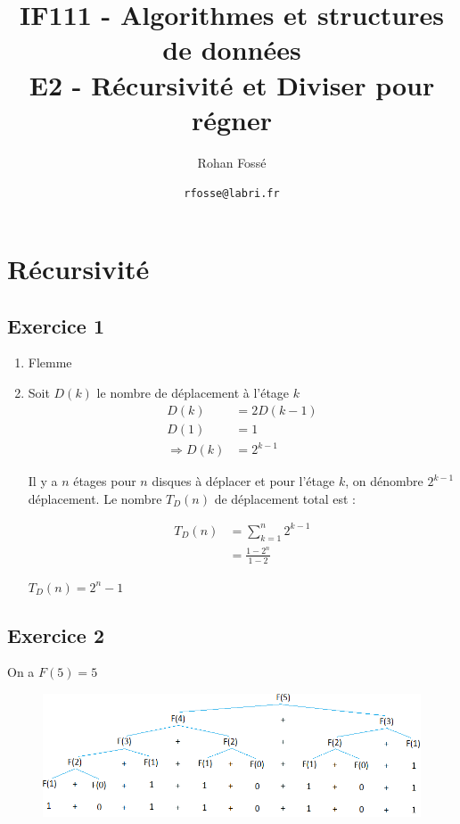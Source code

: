 \documentclass{article}[12pt]
\title{IF111 - Algorithmes et structures de données\\E2 - Récursivité et Diviser pour régner}
\date{\texttt{rfosse@labri.fr}}
\author{Rohan Fossé}
\begin{document}
\maketitle{}

\section{Récursivité}

\subsection*{Exercice 1}
\begin{enumerate}
\item Flemme



        \item Soit $D(k)$ le nombre de déplacement à l'étage $k$
        \begin{align*}
            D(k) &= 2D(k-1)\\
            D(1) &= 1\\
            \Rightarrow D(k) &= 2^{k-1}
        \end{align*}
        
        Il y a $n$ étages pour $n$ disques à déplacer et pour l'étage $k
        $, on dénombre $2^{k-1}$ déplacement. Le nombre $T_D(n)$ de déplacement total est :
        
        \begin{align*}
            T_D(n) &= \sum_{k=1}^{n}2^{k-1}\\
            & = \frac{1-2^n}{1-2}
        \end{align*}
        \begin{center}
            \begin{tcolorbox}[text width = 2.8cm]
                $T_D(n) = 2^n -1$
            \end{tcolorbox}
        \end{center}
\end{enumerate}

\subsection*{Exercice 2}
    On a $F(5) = 5$
    \begin{figure}[h!]
            \centering
            \includegraphics[scale = 0.91]{Fibonacci.png}
    \end{figure}
\end{document}
